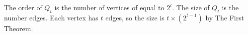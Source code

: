 The order of $Q_t$ is the number of vertices of equal to $2^t$.
The size of $Q_t$ is the number edges. Each vertex has $t$ edges, so the size is $t \times \left(2^{t-1}\right)$ by The First Theorem.
